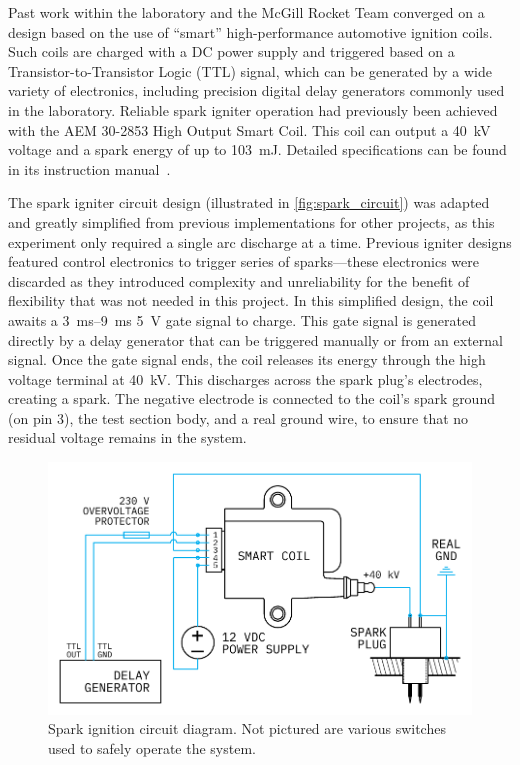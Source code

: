             Past work within the laboratory and the McGill Rocket Team converged on a design based on the use of ``smart'' high-performance automotive ignition coils. Such coils are charged with a DC power supply and triggered based on a Transistor-to-Transistor Logic (TTL) signal, which can be generated by a wide variety of electronics, including precision digital delay generators commonly used in the laboratory. Reliable spark igniter operation had previously been achieved with the AEM 30-2853 High Output Smart Coil. This coil can output a \qty{40}{kV} voltage and a spark energy of up to \qty{103}{mJ}. Detailed specifications can be found in its instruction manual~\cite{aemperformanceelectronicsInstructionManual302853}.
            
            The spark igniter circuit design (illustrated in \autoref{fig:spark_circuit}) was adapted and greatly simplified from previous implementations for other projects, as this experiment only required a single arc discharge at a time. Previous igniter designs featured control electronics to trigger series of sparks---these electronics were discarded as they introduced complexity and unreliability for the benefit of flexibility that was not needed in this project. In this simplified design, the coil awaits a \qtyrange{3}{9}{ms} 5~V gate signal to charge. This gate signal is generated directly by a delay generator that can be triggered manually or from an external signal. Once the gate signal ends, the coil releases its energy through the high voltage terminal at \qty{40}{kV}. This discharges across the spark plug's electrodes, creating a spark. The negative electrode is connected to the coil's spark ground (on pin 3), the test section body, and a real ground wire, to ensure that no residual voltage remains in the system.

            \begin{figure}[h]
                \centering
                \includegraphics[]{assets/3 design/sparkIgniter.pdf}
                \caption[Spark ignition circuit diagram]{Spark ignition circuit diagram. Not pictured are various switches used to safely operate the system.}
                \label{fig:spark_circuit}
            \end{figure}

